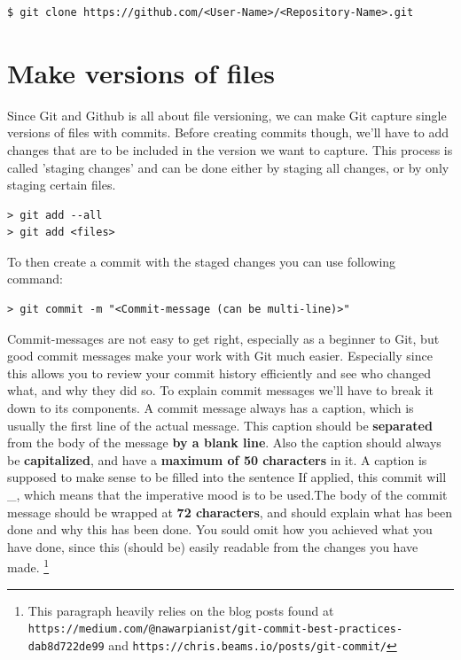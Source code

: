 \documentclass[a4paper, 12pt]{article}
\begin{document}
		\begin{lstlisting}
$ git clone https://github.com/<User-Name>/<Repository-Name>.git
		\end{lstlisting}

	\section{Make versions of files}
	
		Since Git and Github is all about file versioning, we can make Git capture single versions of files with commits. Before creating commits though, we'll have to add changes that are to be included in the version we want to capture. This process is called 'staging changes' and can be done either by staging all changes, or by only staging certain files.
		
		\begin{lstlisting}
> git add --all
> git add <files>
		\end{lstlisting}
		
		To then create a commit with the staged changes you can use following command:
		
		\begin{lstlisting}
> git commit -m "<Commit-message (can be multi-line)>"
		\end{lstlisting}
		\newpage
		
		Commit-messages are not easy to get right, especially as a beginner to Git, but good commit messages make your work with Git much easier. Especially since this allows you to review your commit history efficiently and see who changed what, and why they did so. To explain commit messages we'll have to break it down to its components. A commit message always has a caption, which is usually the first line of the actual message. This caption should be \textbf{separated} from the body of the message \textbf{by a blank line}. Also the caption should always be \textbf{capitalized}, and have a \textbf{maximum of 50 characters} in it. A caption is supposed to make sense to be filled into the sentence \glqq If applied, this commit will \_\grqq, which means that the imperative mood is to be used.The body of the commit message should be wrapped at \textbf{72 characters}, and should explain what has been done and why this has been done. You sould omit how you achieved what you have done, since this (should be) easily readable from the changes you have made. \footnote{This paragraph heavily relies on the blog posts found at \lstinline|https://medium.com/@nawarpianist/git-commit-best-practices-dab8d722de99| and \lstinline|https://chris.beams.io/posts/git-commit/|}
		
\end{document}
